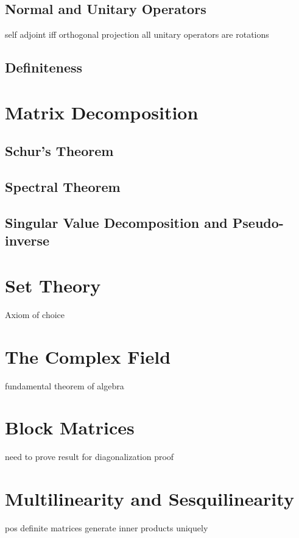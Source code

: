 \documentclass[oneside, 12pt]{book}
\theoremstyle{definition}
\begin{document}
\section{Normal and Unitary Operators}
self adjoint iff orthogonal projection
all unitary operators are rotations
\section{Definiteness}
\chapter{Matrix Decomposition}
\section{Schur's Theorem}
\section{Spectral Theorem}
\section{Singular Value Decomposition and Pseudo-inverse}
\appendix
\chapter{Set Theory}
Axiom of choice
\chapter{The Complex Field}
fundamental theorem of algebra
\chapter{Block Matrices}
need to prove result for diagonalization proof
\chapter{Multilinearity and Sesquilinearity}
pos definite matrices generate inner products uniquely
\cleardoublepage
{}
{}
\printbibliography[title={References}]
\end{document}
